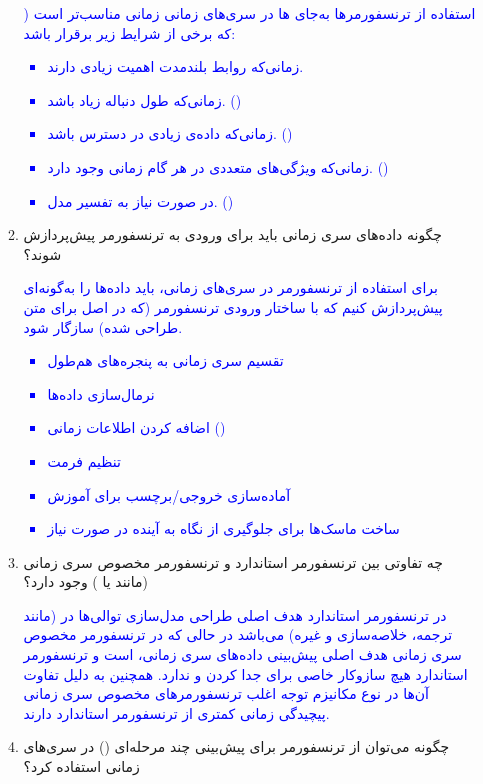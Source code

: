 \documentclass[12pt]{article}
\begin{document}
\begin{enumerate}
\begin{enumerate}
        \textcolor{blue}{
        ) استفاده از ترنسفورمرها به‌جای  ها در سری‌های زمانی  زمانی مناسب‌تر است که برخی از شرایط زیر برقرار باشد:
        \begin{itemize}
            \item زمانی‌که روابط بلندمدت اهمیت زیادی دارند.
            \item زمانی‌که طول دنباله زیاد باشد. ()
            \item زمانی‌که داده‌ی زیادی در دسترس باشد. ()
            \item زمانی‌که ویژگی‌های متعددی در هر گام زمانی وجود دارد. ()
            \item در صورت نیاز به تفسیر مدل. ()
        \end{itemize}
        }
        \item چگونه داده‌های سری زمانی باید برای ورودی به ترنسفورمر پیش‌پردازش شوند؟
        
        \textcolor{blue}{
        برای استفاده از ترنسفورمر در سری‌های زمانی، باید داده‌ها را به‌گونه‌ای پیش‌پردازش کنیم که با ساختار ورودی ترنسفورمر (که در اصل برای متن طراحی شده) سازگار شود. 
        \begin{itemize}
            \item تقسیم سری زمانی به پنجره‌های هم‌طول
            \item نرمال‌سازی داده‌ها
            \item اضافه کردن اطلاعات زمانی ()
            \item تنظیم فرمت 
            \item آماده‌سازی خروجی/برچسب برای آموزش
            \item ساخت ماسک‌ها برای جلوگیری از نگاه به آینده در صورت نیاز
        \end{itemize}
        }
        \item چه تفاوتی بین ترنسفورمر استاندارد و ترنسفورمر مخصوص سری زمانی (مانند   یا ) وجود دارد؟

        \textcolor{blue}{
        در ترنسفورمر استاندارد هدف اصلی طراحی مدل‌سازی توالی‌ها در  (مانند ترجمه، خلاصه‌سازی و غیره) می‌باشد در حالی که در ترنسفورمر مخصوص سری زمانی هدف اصلی پیش‌بینی داده‌های سری زمانی، است و ترنسفورمر استاندارد هیچ سازوکار خاصی برای جدا کردن   و  ندارد.
        همچنین به دلیل تفاوت آن‌ها در نوع مکانیزم توجه اغلب ترنسفورمرهای مخصوص سری زمانی پیچیدگی زمانی کمتری از ترنسفورمر استاندارد دارند.
        }
        \item چگونه می‌توان از ترنسفورمر برای پیش‌بینی چند مرحله‌ای () در سری‌های زمانی استفاده کرد؟


\end{enumerate}
\end{enumerate}
\end{document}
